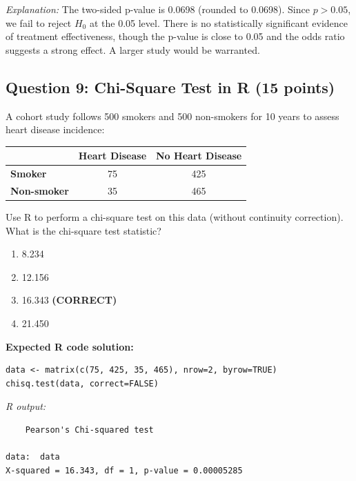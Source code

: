 \documentclass[11pt]{article}
\begin{document}
\textit{Explanation:} The two-sided p-value is 0.0698 (rounded to 0.0698). Since $p > 0.05$, we fail to reject $H_0$ at the 0.05 level. There is no statistically significant evidence of treatment effectiveness, though the p-value is close to 0.05 and the odds ratio suggests a strong effect. A larger study would be warranted.

\vspace{1cm}

\subsection*{Question 9: Chi-Square Test in R (15 points)}

A cohort study follows 500 smokers and 500 non-smokers for 10 years to assess heart disease incidence:

\begin{center}
\begin{tabular}{l|cc}
& \textbf{Heart Disease} & \textbf{No Heart Disease} \\
\hline
\textbf{Smoker} & 75 & 425 \\
\textbf{Non-smoker} & 35 & 465 \\
\end{tabular}
\end{center}

Use R to perform a chi-square test on this data (without continuity correction). What is the chi-square test statistic?

\begin{enumerate}[label=\Alph*.]
\item 8.234
\item 12.156
\item 16.343 \textbf{(CORRECT)}
\item 21.450
\end{enumerate}

\vspace{0.5cm}

\textbf{Expected R code solution:}
\begin{verbatim}
data <- matrix(c(75, 425, 35, 465), nrow=2, byrow=TRUE)
chisq.test(data, correct=FALSE)
\end{verbatim}

\textit{R output:}
\begin{verbatim}
	Pearson's Chi-squared test

data:  data
X-squared = 16.343, df = 1, p-value = 0.00005285
\end{verbatim}
\end{document}
